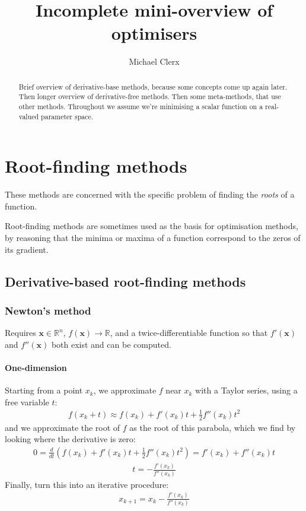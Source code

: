\documentclass[10pt]{article}
\title{Incomplete mini-overview of optimisers}
\author{Michael Clerx}
\begin{document}
\addtolength{\abovedisplayskip}{-6pt}
\addtolength{\belowdisplayskip}{-6pt}
\maketitle

\begin{abstract}
Brief overview of derivative-base methods, because some concepts come up again later.
Then longer overview of derivative-free methods.
Then some meta-methods, that use other methods.
Throughout we assume we're minimising a scalar function on a real-valued parameter space.
\end{abstract}

%
%
%
%
\section{Root-finding methods}

These methods are concerned with the specific problem of finding the \emph{roots} of a function.

Root-finding methods are sometimes used as the basis for optimisation methods, by reasoning that the minima or maxima of a function correspond to the zeros of its gradient.

%
%
\subsection{Derivative-based root-finding methods}

\subsubsection{Newton's method}

Requires $\bm{x} \in \mathbb{R}^n$, $f(\bm{x}) \to \mathbb{R}$, and a twice-differentiable function so that $f'(\bm{x})$ and $f''(\bm{x})$ both exist and can be computed.

\paragraph{One-dimension}

Starting from a point $x_k$, we approximate $f$ near $x_k$ with a Taylor series, using a free variable $t$:
\begin{align}
f(x_k + t) \approx f(x_k) + f'(x_k)t + \frac{1}{2}f''(x_k)t^2
\end{align}
and we approximate the root of $f$ as the root of this parabola, which we find by looking where the derivative is zero:
\begin{align}
0 = \frac{d}{dt} \left( f(x_k) + f'(x_k)t + \frac{1}{2}f''(x_k)t^2 \right)
   = f'(x_k) + f''(x_k)t
\end{align}
\begin{align}
t = -\frac{f'(x_k)}{f''(x_k)}
\end{align}
Finally, turn this into an iterative procedure:
\begin{align}
x_{k+1} = x_k -\frac{f'(x_k)}{f''(x_k)}
\end{align}
\end{document}
